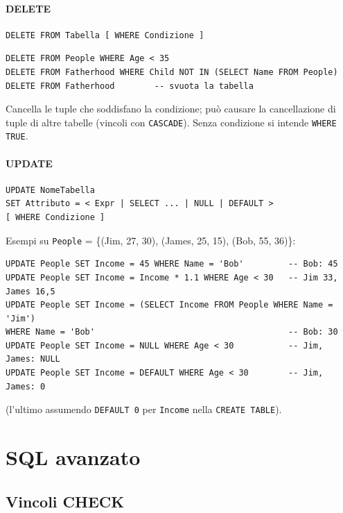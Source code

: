 \documentclass[a4paper,12pt]{article}
\begin{document}
\paragraph{DELETE}
\begin{verbatim}
DELETE FROM Tabella [ WHERE Condizione ]
\end{verbatim}
\begin{verbatim}
DELETE FROM People WHERE Age < 35
DELETE FROM Fatherhood WHERE Child NOT IN (SELECT Name FROM People)
DELETE FROM Fatherhood        -- svuota la tabella
\end{verbatim}
Cancella le tuple che soddisfano la condizione; può causare la cancellazione
di tuple di altre tabelle (vincoli con \texttt{CASCADE}). Senza condizione si
intende \texttt{WHERE TRUE}.

\paragraph{UPDATE}
\begin{verbatim}
UPDATE NomeTabella
SET Attributo = < Expr | SELECT ... | NULL | DEFAULT >
[ WHERE Condizione ]
\end{verbatim}
Esempi su \texttt{People} = \{(Jim, 27, 30), (James, 25, 15), (Bob, 55, 36)\}:
\begin{verbatim}
UPDATE People SET Income = 45 WHERE Name = 'Bob'         -- Bob: 45
UPDATE People SET Income = Income * 1.1 WHERE Age < 30   -- Jim 33, James 16,5
UPDATE People SET Income = (SELECT Income FROM People WHERE Name = 'Jim')
WHERE Name = 'Bob'                                       -- Bob: 30
UPDATE People SET Income = NULL WHERE Age < 30           -- Jim, James: NULL
UPDATE People SET Income = DEFAULT WHERE Age < 30        -- Jim, James: 0
\end{verbatim}
(l'ultimo assumendo \texttt{DEFAULT 0} per \texttt{Income} nella
\texttt{CREATE TABLE}).

\section{SQL avanzato}

\subsection{Vincoli CHECK}
\end{document}
